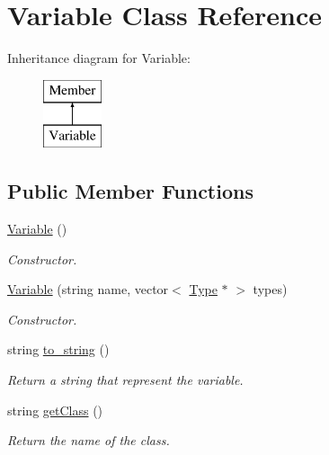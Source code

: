 \hypertarget{classVariable}{\section{Variable Class Reference}
\label{classVariable}
}
Inheritance diagram for Variable\+:\begin{figure}[H]
\begin{center}
\leavevmode
\includegraphics[height=2.000000cm]{classVariable}
\end{center}
\end{figure}
\subsection*{Public Member Functions}
\begin{DoxyCompactItemize}
\item 
\hypertarget{classVariable_a5716c9dcafcc8cf59a6f6b5dac3ec7a2}{\hyperlink{classVariable_a5716c9dcafcc8cf59a6f6b5dac3ec7a2}{Variable} ()}\label{classVariable_a5716c9dcafcc8cf59a6f6b5dac3ec7a2}

\begin{DoxyCompactList}\small\item\em Constructor. \end{DoxyCompactList}\item 
\hyperlink{classVariable_a9284a18cac758e26052f610a69b8921a}{Variable} (string name, vector$<$ \hyperlink{classType}{Type} $\ast$ $>$ types)
\begin{DoxyCompactList}\small\item\em Constructor. \end{DoxyCompactList}\item 
string \hyperlink{classVariable_a193be8605a472ddcceba928e746ffac2}{to\+\_\+string} ()
\begin{DoxyCompactList}\small\item\em Return a string that represent the variable. \end{DoxyCompactList}\item 
string \hyperlink{classVariable_aaebc8ef1594f951323e33725abfd69b5}{get\+Class} ()
\begin{DoxyCompactList}\small\item\em Return the name of the class. \end{DoxyCompactList}\end{DoxyCompactItemize}
